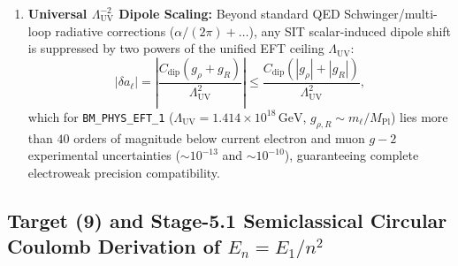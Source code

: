 \begin{enumerate}[leftmargin=2em]
  \item \textbf{Universal $\Lambda_{\mathrm{UV}}^{-2}$ Dipole Scaling:} Beyond standard QED Schwinger/multi-loop radiative corrections ($\alpha/(2\pi) + \dots$), any SIT scalar-induced dipole shift is suppressed by two powers of the unified EFT ceiling $\Lambda_{\mathrm{UV}}$:
  \begin{equation}
  |\delta a_\ell| = \left|\frac{C_{\mathrm{dip}}(g_\rho + g_R)}{\Lambda_{\mathrm{UV}}^2}\right|
  \le \frac{C_{\mathrm{dip}}(|g_\rho| + |g_R|)}{\Lambda_{\mathrm{UV}}^2},
  \label{eq:g2_uv_suppression}
  \end{equation}
  which for \texttt{BM\_PHYS\_EFT\_1} ($\Lambda_{\mathrm{UV}} = 1.414\times 10^{18}\,\mathrm{GeV}$, $g_{\rho,R} \sim m_\ell / M_{\mathrm{Pl}}$) lies more than $40$ orders of magnitude below current electron and muon $g-2$ experimental uncertainties ($\sim 10^{-13}$ and $\sim 10^{-10}$), guaranteeing complete electroweak precision compatibility.
\end{enumerate}

\subsection{Target (9) and Stage-5.1 Semiclassical Circular Coulomb Derivation of $E_n = E_1/n^2$}

